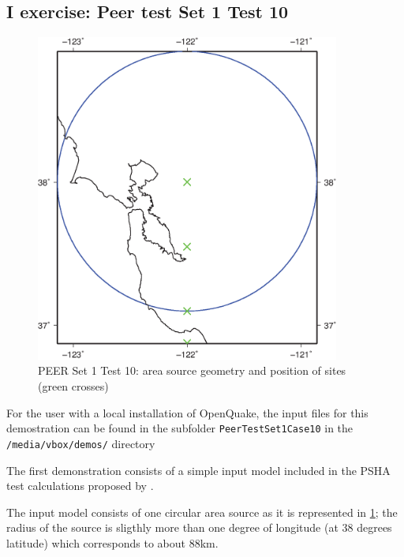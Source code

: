 \subsection{I exercise: Peer test Set 1 Test 10}
\begin{figure}[!ht]
\begin{center}
\includegraphics[width=10cm]{./figures/peer_set1_test10/peerSet1test10a.eps}
\caption{PEER Set 1 Test 10: area source geometry and position of sites (green
    crosses)}
\label{fig:demo_peer_set1_test10}
\end{center}
\end{figure}
%
For the user with a local installation of OpenQuake, the input files for 
this demostration can be found in the subfolder \texttt{PeerTestSet1Case10} 
in the \texttt{/media/vbox/demos/} directory 

The first demonstration consists of a simple input model included in the 
PSHA test calculations proposed by \citet{thomas2010}.

The input model consists of one circular area source as it is 
represented in \ref{fig:demo_peer_set1_test10}; the radius of the source 
is sligthly more than one degree of longitude (at 38 degrees latitude) 
which corresponds to about 88km.

